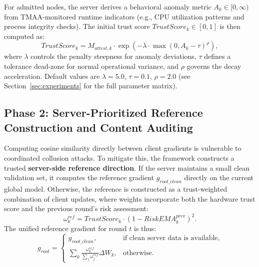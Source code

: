 \documentclass[runningheads]{llncs}
\begin{document}
For admitted nodes, the server derives a behavioral anomaly metric $A_k \in [0, \infty)$ from TMAA-monitored runtime indicators (e.g., CPU utilization patterns and process integrity checks). The initial trust score $TrustScore_k \in [0, 1]$ is then computed as:
\begin{equation}
    TrustScore_{k} = M_{attest,k} \cdot \exp\left(-\lambda \cdot\max(0, A_{k} - \tau)^{\rho}\right),
\end{equation}
where $\lambda$ controls the penalty steepness for anomaly deviations, $\tau$ defines a tolerance dead-zone for normal operational variance, and $\rho$ governs the decay acceleration. Default values are $\lambda=5.0$, $\tau=0.1$, $\rho=2.0$ (see Section~\ref{sec:experiments} for the full parameter matrix).

\subsection{Phase 2: Server-Prioritized Reference Construction and Content Auditing}
Computing cosine similarity directly between client gradients is vulnerable to coordinated collusion attacks. To mitigate this, the framework constructs a trusted \textbf{server-side reference direction}.
If the server maintains a small clean validation set, it computes the reference gradient $g_{root\_clean}$ directly on the current global model. Otherwise, the reference is constructed as a trust-weighted combination of client updates, where weights incorporate both the hardware trust score and the previous round's risk assessment:
\begin{equation}
    \omega_{k}^{ref} = TrustScore_{k} \cdot (1 - RiskEMA_{k}^{prev})^{2}.
\end{equation}
The unified reference gradient for round $t$ is thus:
\begin{equation}
    g_{root}=
    \begin{cases}
        g_{root\_clean}, & \text{if clean server data is available}, \\
        \sum_{k} \frac{\omega_{k}^{ref}}{\sum_j \omega_{j}^{ref}} \Delta W_k, & \text{otherwise}.
    \end{cases}
\end{equation}
\end{document}
